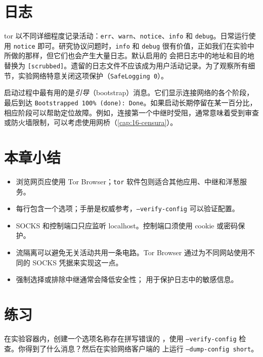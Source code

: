 \section{日志}\label{sec:torrc-log}

tor 以不同详细程度记录活动：\texttt{err}、\texttt{warn}、\texttt{notice}、\texttt{info} 和 \texttt{debug}。日常运行使用 \texttt{notice} 即可。研究协议问题时，\texttt{info} 和 \texttt{debug} 很有价值，正如我们在实验中所做的那样，但它们也会产生大量日志。默认启用的  会把日志中的地址和目的地替换为 \texttt{[scrubbed]}。遗留的日志文件不应该成为用户活动记录。为了观察所有细节，实验网络特意关闭这项保护（\texttt{SafeLogging 0}）。

启动过程中最有用的是\emph{引导}（bootstrap）消息。它们显示连接网络的各个阶段，最后到达 \texttt{Bootstrapped 100\% (done): Done}。如果启动长期停留在某一百分比，相应阶段可以帮助定位故障。例如，连接第一个中继时受阻，通常意味着受到审查或防火墙限制，可以考虑使用网桥（\cref{cap:16-censura}）。

\section*{本章小结}
\begin{itemize}
  \item 浏览网页应使用 Tor Browser；\texttt{tor} 软件包则适合其他应用、中继和洋葱服务。
  \item {} 每行包含一个选项；手册是权威参考，\texttt{--verify-config} 可以验证配置。
  \item SOCKS 和控制端口只应监听 localhost。控制端口须使用 cookie 或密码保护。
  \item 流隔离可以避免无关活动共用一条电路。Tor Browser 通过为不同网站使用不同的 SOCKS 凭据来实现这一点。
  \item 强制选择或排除中继通常会降低安全性； 用于保护日志中的敏感信息。
\end{itemize}

\section*{练习}

\begin{esercizio}[1]\label{es:17-verifica}
在实验容器内，创建一个选项名称存在拼写错误的 ，使用 \texttt{--verify-config} 检查。你得到了什么消息？然后在实验网络客户端的  上运行 \texttt{--dump-config short}。
\end{esercizio}

